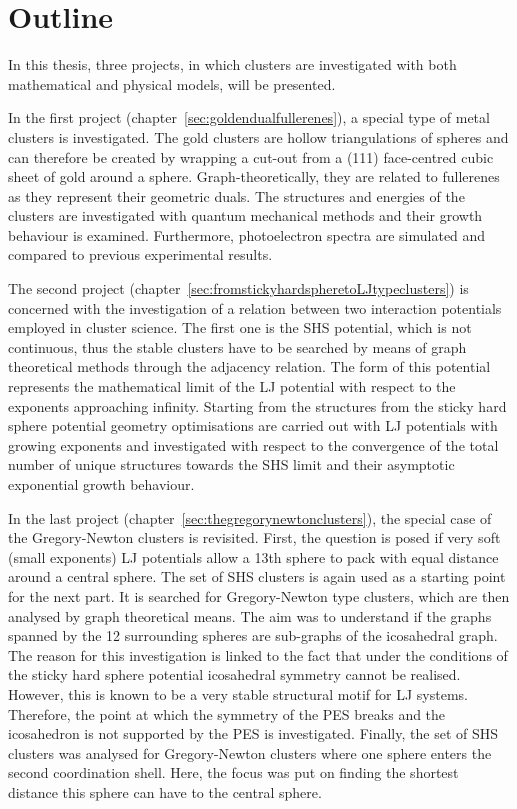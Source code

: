 \section{Outline}
\label{sec:Outline}

In this thesis, three projects, in which clusters are investigated with both
mathematical and physical models, will be presented.

In the first project (chapter~\ref{sec:goldendualfullerenes}), a special type of
metal clusters is investigated. The gold clusters are hollow triangulations of
spheres and can therefore be created by wrapping a cut-out from a (111)
face-centred cubic sheet of gold around a sphere. Graph-theoretically, they are
related to fullerenes as they represent their geometric duals. The structures
and energies of the clusters are investigated with quantum mechanical methods
and their growth behaviour is examined. Furthermore, photoelectron spectra are
simulated and compared to previous experimental results.

The second project (chapter~\ref{sec:fromstickyhardspheretoLJtypeclusters}) is
concerned with the investigation of a relation between two interaction
potentials employed in cluster science. The first one is the \ac{SHS} potential,
which is not continuous, thus the stable clusters have to be searched by means
of graph theoretical methods through the adjacency relation. The form of this
potential represents the mathematical limit of the \ac{LJ} potential with
respect to the exponents approaching infinity. Starting from the structures from
the sticky hard sphere potential geometry optimisations are carried out with
\ac{LJ} potentials with growing exponents and investigated with respect to the
convergence of the total number of unique structures towards the \ac{SHS} limit
and their asymptotic exponential growth behaviour.

In the last project (chapter~\ref{sec:thegregorynewtonclusters}), the special
case of the Gregory-Newton clusters is revisited. First, the question is posed
if very soft (small exponents) \ac{LJ} potentials allow a 13th sphere to pack
with equal distance around a central sphere. The set of \ac{SHS} clusters is
again used as a starting point for the next part. It is searched for
Gregory-Newton type clusters, which are then analysed by graph theoretical
means. The aim was to understand if the graphs spanned by the 12 surrounding
spheres are sub-graphs of the icosahedral graph. The reason for this
investigation is linked to the fact that under the conditions of the sticky hard
sphere potential icosahedral symmetry cannot be realised. However, this is known
to be a very stable structural motif for \ac{LJ} systems. Therefore, the point
at which the symmetry of the \ac{PES} breaks and the icosahedron is not
supported by the \ac{PES} is investigated. Finally, the set of \ac{SHS} clusters
was analysed for Gregory-Newton clusters where one sphere enters the second
coordination shell. Here, the focus was put on finding the shortest distance
this sphere can have to the central sphere.



